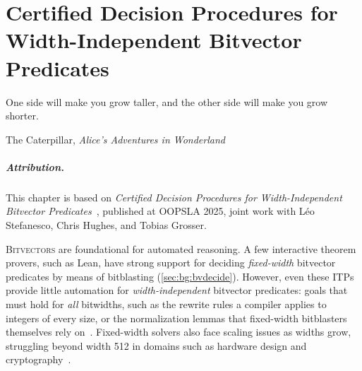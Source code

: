\chapter{Certified Decision Procedures for Width-Independent Bitvector Predicates}
\label{ch:single-width-bv}
\epigraph{One side will make you grow taller, and the other side will make you
grow shorter.}{The Caterpillar, \emph{Alice's Adventures in Wonderland}}

\newcommand{\bitstream}{\ensuremath{\mathsf{Bitstream}}}
\newcommand{\Reach}{\ensuremath{\mathsf{Reach}}}
\newcommand{\ReachViaTruePath}{\ensuremath{\mathsf{ReachViaTruePath}}}
\newcommand{\InitPrecond}{\ensuremath{\mathsf{InitPrecond}}}
\newcommand{\Ind}{\ensuremath{\mathsf{Ind}}}
\newcommand{\Safe}{\ensuremath{\mathsf{Safe}}}
\newcommand{\xtosquig}[1]{\xrightarrow{\footnotesize #1}\!\!^*}
\newcommand{\bvfst}[1]{\colorbox{swbvLightPurple}{#1}}
\newcommand{\bvsnd}[1]{\colorbox{swbvLightYellow}{#1}}
\newcommand{\bvpair}[2]{\bvfst{#1}:\bvsnd{#2}}
\newcommand{\MBATotalLines}{800}
\newcommand{\MBATotalProblems}{2500}



\paragraph*{Attribution.} This chapter is based on \emph{Certified Decision
Procedures for Width-Independent Bitvector Predicates}~\citep{bhat2025certified},
published at OOPSLA 2025, joint work with Léo Stefanesco, Chris Hughes, and
Tobias Grosser.

\lettrine{B}{itvectors} are foundational for automated reasoning. A few
interactive theorem provers, such as Lean, have strong support for deciding
\emph{fixed-width} bitvector predicates by means of bitblasting
(\cref{sec:bg:bvdecide}). However, even these ITPs provide little automation
for \emph{width-independent} bitvector predicates: goals that must hold for
\emph{all} bitwidths, such as the rewrite rules a compiler applies to
integers of every size, or the normalization lemmas that fixed-width
bitblasters themselves rely on~\citep{niemetz2024scalable}. Fixed-width
solvers also face scaling issues as widths grow, struggling beyond width 512
in domains such as hardware design and
cryptography~\citep{lopes2018future,mukherjee2024hydra}.

